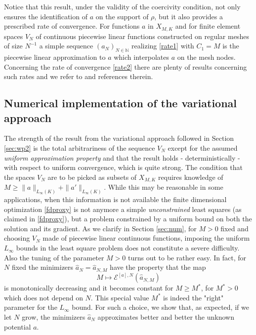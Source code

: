 Notice that this result, under the validity of the coercivity condition, not only ensures the identification of $a$ on the support of $\rho$, but it also provides a prescribed rate of convergence.
For functions $a$ in $X_{M,K}$ and for finite element spaces $V_N$ of continuous piecewise linear functions constructed on regular meshes of size $N^{-1}$ a simple sequence $(a_N)_{N \in \mathbb N}$  realizing \eqref{rate1} with $C_1=M$ is the piecewise linear approximation to $a$ which interpolates $a$ on the mesh nodes. Concerning the rate of convergence \eqref{rate2} there are plenty of results
concerning such rates and we refer to \cite{descsc13} and references therein.



\subsection{Numerical implementation of the variational approach }\label{sec:wp3}


The strength of the result from the variational approach followed in Section \ref{sec:wp2} is the total arbitrariness of the sequence $V_N$ except
for the assumed {\it uniform approximation property} and that the result holds - deterministically - with respect to uniform convergence, which is quite strong. 
The condition that the spaces $V_N$ are to be picked as subsets of $X_{M,K}$ requires knowledge of $M \geq \|a\|_{L_{\infty}(K)} + \|a'\|_{L_{\infty}(K)}$. While this may be reasonable in some applications, when this information is not available 
the finite dimensional optimization \eqref{fdproxy} is not anymore a simple {\it unconstrained} least squares (as claimed in \eqref{fdproxy}),
but a problem constrained by a uniform bound on both the solution and its gradient. 
As we clarify in Section \ref{sec:num}, for $M>0$ fixed and choosing $V_N$ made of piecewise linear continuous functions, imposing the uniform $L_\infty$ bounds in the least square problem does not constitute a severe difficulty.
Also the tuning of the parameter $M>0$ turns out to be rather easy. In fact, for $N$ fixed the minimizers $\widehat a_N = \widehat a_{N,M}$ have the property that the map
$$
 M \mapsto   \mathcal E^{[a],N}(\widehat a_{N,M})
$$
is monotonically decreasing and it becomes constant for $M\geq M^*$, for $M^*>0$ which does not depend on $N$. This special value $M^*$ is indeed the "right" parameter for the $L_\infty$ bound. For such a choice, we show that, as expected, if we let $N$ grow, the minimizers $\widehat{a}_N$ approximates better and better the unknown potential $a$. 
\\

